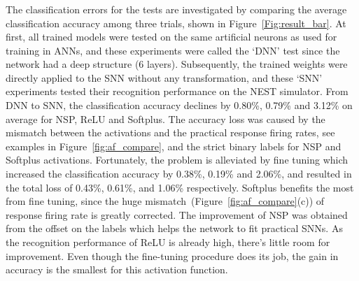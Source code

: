 	\subsubsection{}
	\DIFaddend The classification errors for the tests are investigated by comparing the average classification accuracy among three trials, shown in Figure~\ref{Fig:result_bar}.
	At first, all trained models were tested on the same artificial neurons as used for training in ANNs, and these experiments were called the `DNN' test since the network had a deep structure (6 layers).
	Subsequently, the trained weights were directly applied to the SNN without any transformation, and these `SNN' experiments tested their recognition performance on the NEST simulator.
	From DNN to SNN, the classification accuracy declines by 0.80\%, 0.79\% and 3.12\% on average for NSP, ReLU and Softplus.
	The accuracy loss was caused by the mismatch between the activations and the practical response firing rates, see examples in Figure~\ref{fig:af_compare}, and the strict binary labels for NSP and Softplus activations.
	Fortunately, the problem is alleviated by fine tuning which increased the classification accuracy by 0.38\%, 0.19\% and 2.06\%, and resulted in the total loss of 0.43\%, 0.61\%, and 1.06\% respectively.
	Softplus benefits the most from fine tuning, since the huge mismatch~(Figure~\ref{fig:af_compare}(c)) of response firing rate is greatly corrected.
	The improvement of NSP was obtained from the offset on the labels which helps the network to fit practical SNNs.
	As the recognition performance of ReLU is already high, there's little room for improvement.
	Even though the fine-tuning procedure does its job, the gain in accuracy is the smallest for this activation function.




